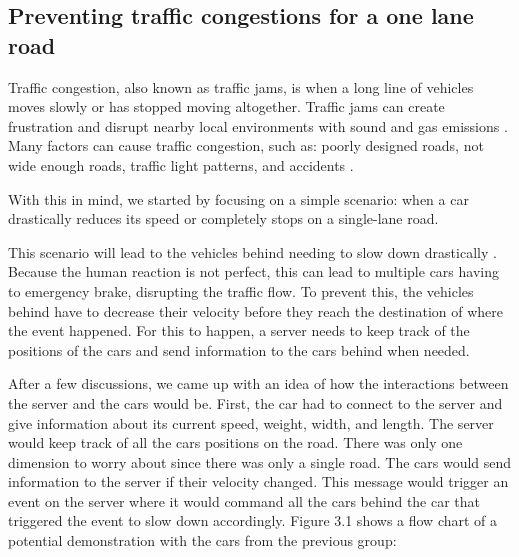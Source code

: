 \subsection{Preventing traffic congestions for a one lane road}

Traffic congestion, also known as traffic jams, is when a long line of vehicles moves slowly or has stopped moving altogether. Traffic jams can create frustration and disrupt nearby local environments with sound and gas emissions \parencite{traffic_congestion_pollution}. Many factors can cause traffic congestion, such as:
poorly designed roads, not wide enough roads, traffic light patterns, and accidents \parencite{traffic_congestion}.

With this in mind, we started by focusing on a simple scenario: when a car drastically reduces its speed or completely stops on a single-lane road.

This scenario will lead to the vehicles behind needing to slow down drastically \parencite{traffic_shockwave}. Because the human reaction is not perfect, this can lead to multiple cars having to emergency brake, disrupting the traffic flow. To prevent this, the vehicles behind have to decrease their velocity before they reach the destination of where the event happened. For this to happen, a server needs to keep track of the positions of the cars and send information to the cars behind when needed. 

After a few discussions, we came up with an idea of how the interactions between the server and the cars would be. First, the car had to connect to the server and give information about its current speed, weight, width, and length. The server would keep track of all the cars positions on the road. There was only one dimension to worry about since there was only a single road. The cars would send information to the server if their velocity changed. This message would trigger an event on the server where it would command all the cars behind the car that triggered the event to slow down accordingly. Figure 3.1 shows a flow chart of a potential demonstration with the cars from the previous group:

